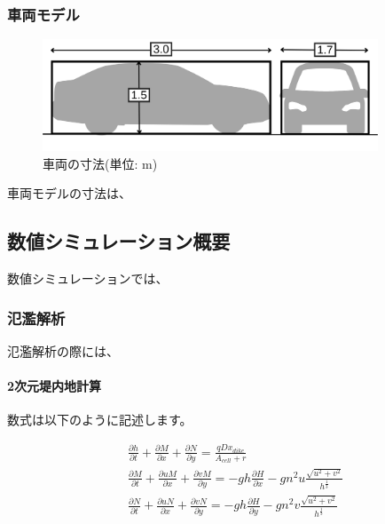 \documentclass[12pt]{jsarticle}
\begin{document}
  \subsubsection{車両モデル}

  \begin{figure}[H]
    \begin{center}
      \includegraphics[width=10cm]{images/car_design.png}
    \end{center}
    \caption{車両の寸法(単位: m)}
    \label{fig:car_design}
  \end{figure}

  車両モデルの寸法は、

  \subsection{数値シミュレーション概要}

  数値シミュレーションでは、

  \subsubsection{氾濫解析}
  
  氾濫解析の際には、

  \paragraph{2次元堤内地計算}

  数式は以下のように記述します。

  \begin{align}
    &\frac{\partial h}{\partial t}
    +\frac{\partial M}{\partial x}
    +\frac{\partial N}{\partial y}
    =\frac{qDx_{dike}}{A_{cell}+r}\\
    &\frac{\partial M}{\partial t}
    +\frac{\partial uM}{\partial x}
    +\frac{\partial vM}{\partial y}
    =-gh\frac{\partial H}{\partial x}
    -gn^2u\frac{\sqrt{u^2+v^2}}{h^{\frac{1}{3}}}\\
    &\frac{\partial N}{\partial t}
    +\frac{\partial uN}{\partial x}
    +\frac{\partial vN}{\partial y}
    =-gh\frac{\partial H}{\partial y}
    -gn^2v\frac{\sqrt{u^2+v^2}}{h^{\frac{1}{3}}}
  \end{align}
\end{document}
